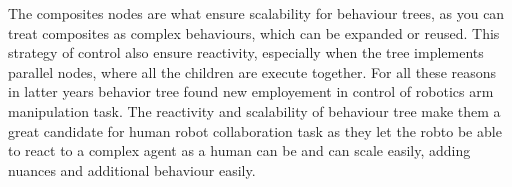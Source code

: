 The composites nodes are what ensure scalability for behaviour trees, as you can treat composites as complex behaviours,
which can be expanded or reused. This strategy of control also ensure reactivity, especially when the tree implements
parallel nodes, where all the children are execute together.
For all these reasons in latter years behavior tree found new employement in control of robotics arm manipulation task. 
The reactivity and scalability of behaviour tree make them a great candidate for human robot collaboration task as they
let the robto be able to react to a complex agent as a human can be and can scale easily, adding nuances and additional
behaviour easily.
